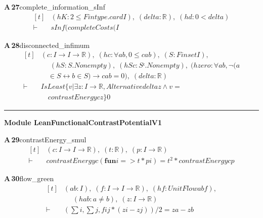 \documentclass[conference]{IEEEtran}
\theoremstyle{definition}
\newcommand{\lean}[1]{\textsf{\footnotesize #1}}
\begin{document}
\noindent\textbf{A\,27}\quad\lean{complete\_information\_sInf}
{\footnotesize\[ \begin{aligned}[t]
&(\mathit{hK} : 2 \leq \mathit{Fintype}.\mathit{card} \mathit{I}),\; (\mathit{delta} : \mathbb{R} ),\; (\mathit{hd} : 0<\mathit{delta})\\
\vdash\;&\mathit{sInf} (\mathit{completeCosts} (\mathit{I}
\end{aligned} \]}

\noindent\textbf{A\,28}\quad\lean{disconnected\_infimum}
{\footnotesize\[ \begin{aligned}[t]
&(\mathit{c} : \mathit{I} \to \mathit{I} \to \mathbb{R} ),\; (\mathit{hc} : \forall \mathit{a} \mathit{b},0 \leq \mathit{c} \mathit{a} \mathit{b}),\; (\mathit{S} : \mathit{Finset} \mathit{I}),\\
&\quad \; (\mathit{hS} : \mathit{S}.\mathit{Nonempty}),\; (\mathit{hSc} : \mathit{Sᶜ}.\mathit{Nonempty}),\; (\mathit{hzero} : \forall \mathit{a} \mathit{b},\neg (\mathit{a}\\
&\quad \in \mathit{S} \leftrightarrow \mathit{b} \in \mathit{S}) \to \mathit{c} \mathit{a} \mathit{b}=0),\; (\mathit{delta} : \mathbb{R} )\\
\vdash\;&\mathit{IsLeast} \{ \mathit{v} | \exists \mathit{z} : \mathit{I} \to \mathbb{R} ,\mathit{Alternative} \mathit{delta} \mathit{z} \wedge \mathit{v}=\\
&\quad \mathit{contrastEnergy} \mathit{c} \mathit{z}\} 0
\end{aligned} \]}

\vspace{4pt}\noindent\rule{\columnwidth}{0.4pt}\par\vspace{2pt}
\noindent\textbf{Module \lean{LeanFunctionalContrastPotentialV1}}\par\vspace{3pt}

\noindent\textbf{A\,29}\quad\lean{contrastEnergy\_smul}
{\footnotesize\[ \begin{aligned}[t]
&(\mathit{c} : \mathit{I} \to \mathit{I} \to \mathbb{R} ),\; (\mathit{t} : \mathbb{R} ),\; (\mathit{p} : \mathit{I} \to \mathbb{R} )\\
\vdash\;&\mathit{contrastEnergy} \mathit{c} (\mathbf{fun} \mathit{i} => \mathit{t}*\mathit{p} \mathit{i}) = \mathit{t}^{2}*\mathit{contrastEnergy} \mathit{c} \mathit{p}
\end{aligned} \]}

\noindent\textbf{A\,30}\quad\lean{flow\_green}
{\footnotesize\[ \begin{aligned}[t]
&(\mathit{a} \mathit{b} : \mathit{I}),\; (\mathit{f} : \mathit{I} \to \mathit{I} \to \mathbb{R} ),\; (\mathit{hf} : \mathit{UnitFlow} \mathit{a} \mathit{b} \mathit{f}),\\
&\quad \; (\mathit{hab} : \mathit{a} \neq \mathit{b}),\; (\mathit{z} : \mathit{I} \to \mathbb{R} )\\
\vdash\;&(\textstyle\sum \mathit{i}, \textstyle\sum \mathit{j}, \mathit{f} \mathit{i} \mathit{j}*(\mathit{z} \mathit{i}-\mathit{z} \mathit{j}))/2 = \mathit{z} \mathit{a}-\mathit{z} \mathit{b}
\end{aligned} \]}
\end{document}
